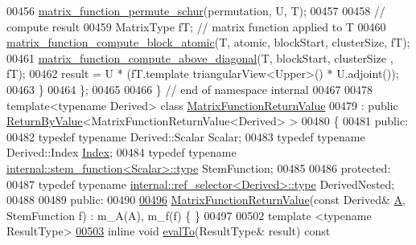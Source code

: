 \begin{DoxyCode}
00456     \hyperlink{namespace_eigen_1_1internal_a59cacdc2f9b480da246258bc9399aa2c}{matrix\_function\_permute\_schur}(permutation, U, T);
00457 
00458     \textcolor{comment}{// compute result}
00459     MatrixType fT; \textcolor{comment}{// matrix function applied to T}
00460     \hyperlink{namespace_eigen_1_1internal_a53e617df189868a791e44d2c4e94403f}{matrix\_function\_compute\_block\_atomic}(T, atomic, blockStart, 
      clusterSize, fT);
00461     \hyperlink{namespace_eigen_1_1internal_a8ff76c47bde59d8af688e5925bed8f17}{matrix\_function\_compute\_above\_diagonal}(T, blockStart, clusterSize
      , fT);
00462     result = U * (fT.template triangularView<Upper>() * U.adjoint());
00463   \}
00464 \};
00465 
00466 \} \textcolor{comment}{// end of namespace internal}
00467 
00478 \textcolor{keyword}{template}<\textcolor{keyword}{typename} Derived> \textcolor{keyword}{class }\hyperlink{class_eigen_1_1_matrix_function_return_value}{MatrixFunctionReturnValue}
00479 : \textcolor{keyword}{public} \hyperlink{group___core___module_class_eigen_1_1_return_by_value}{ReturnByValue}<MatrixFunctionReturnValue<Derived> >
00480 \{
00481   \textcolor{keyword}{public}:
00482     \textcolor{keyword}{typedef} \textcolor{keyword}{typename} Derived::Scalar Scalar;
00483     \textcolor{keyword}{typedef} \textcolor{keyword}{typename} Derived::Index \hyperlink{namespace_eigen_a62e77e0933482dafde8fe197d9a2cfde}{Index};
00484     \textcolor{keyword}{typedef} \textcolor{keyword}{typename} \hyperlink{struct_eigen_1_1internal_1_1stem__function}{internal::stem\_function<Scalar>::type} 
      StemFunction;
00485 
00486   \textcolor{keyword}{protected}:
00487     \textcolor{keyword}{typedef} \textcolor{keyword}{typename} \hyperlink{class_eigen_1_1internal_1_1_tensor_lazy_evaluator_writable}{internal::ref\_selector<Derived>::type} 
      DerivedNested;
00488 
00489   \textcolor{keyword}{public}:
00490 
\hyperlink{class_eigen_1_1_matrix_function_return_value_af193d7a3e1b4e65dc70e64eb4bc8e17f}{00496}     \hyperlink{class_eigen_1_1_matrix_function_return_value_af193d7a3e1b4e65dc70e64eb4bc8e17f}{MatrixFunctionReturnValue}(\textcolor{keyword}{const} Derived& \hyperlink{group___core___module_class_eigen_1_1_matrix}{A}, StemFunction f) : m\_A(A), m\_f(f) 
      \{ \}
00497 
00502     \textcolor{keyword}{template} <\textcolor{keyword}{typename} ResultType>
\hyperlink{class_eigen_1_1_matrix_function_return_value_a202d594ae254e3ea5420ff95d9f03a67}{00503}     \textcolor{keyword}{inline} \textcolor{keywordtype}{void} \hyperlink{class_eigen_1_1_matrix_function_return_value_a202d594ae254e3ea5420ff95d9f03a67}{evalTo}(ResultType& result)\textcolor{keyword}{ const}

\end{DoxyCode}
